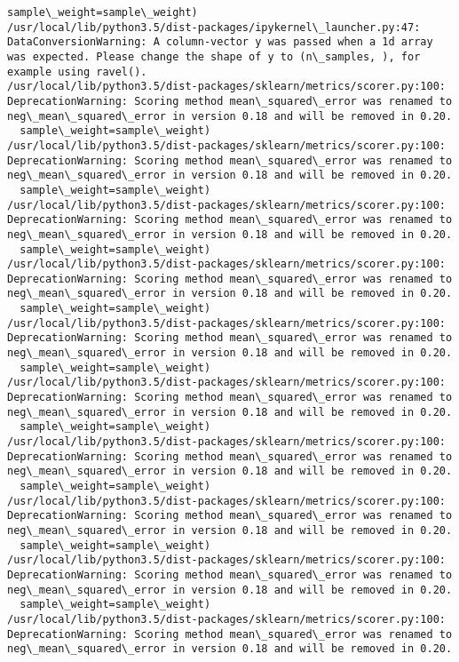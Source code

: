 \documentclass[11pt]{article}
\begin{document}
\begin{Verbatim}[commandchars=\\\{\}]
  sample\_weight=sample\_weight)
/usr/local/lib/python3.5/dist-packages/ipykernel\_launcher.py:47: DataConversionWarning: A column-vector y was passed when a 1d array was expected. Please change the shape of y to (n\_samples, ), for example using ravel().
/usr/local/lib/python3.5/dist-packages/sklearn/metrics/scorer.py:100: DeprecationWarning: Scoring method mean\_squared\_error was renamed to neg\_mean\_squared\_error in version 0.18 and will be removed in 0.20.
  sample\_weight=sample\_weight)
/usr/local/lib/python3.5/dist-packages/sklearn/metrics/scorer.py:100: DeprecationWarning: Scoring method mean\_squared\_error was renamed to neg\_mean\_squared\_error in version 0.18 and will be removed in 0.20.
  sample\_weight=sample\_weight)
/usr/local/lib/python3.5/dist-packages/sklearn/metrics/scorer.py:100: DeprecationWarning: Scoring method mean\_squared\_error was renamed to neg\_mean\_squared\_error in version 0.18 and will be removed in 0.20.
  sample\_weight=sample\_weight)
/usr/local/lib/python3.5/dist-packages/sklearn/metrics/scorer.py:100: DeprecationWarning: Scoring method mean\_squared\_error was renamed to neg\_mean\_squared\_error in version 0.18 and will be removed in 0.20.
  sample\_weight=sample\_weight)
/usr/local/lib/python3.5/dist-packages/sklearn/metrics/scorer.py:100: DeprecationWarning: Scoring method mean\_squared\_error was renamed to neg\_mean\_squared\_error in version 0.18 and will be removed in 0.20.
  sample\_weight=sample\_weight)
/usr/local/lib/python3.5/dist-packages/sklearn/metrics/scorer.py:100: DeprecationWarning: Scoring method mean\_squared\_error was renamed to neg\_mean\_squared\_error in version 0.18 and will be removed in 0.20.
  sample\_weight=sample\_weight)
/usr/local/lib/python3.5/dist-packages/sklearn/metrics/scorer.py:100: DeprecationWarning: Scoring method mean\_squared\_error was renamed to neg\_mean\_squared\_error in version 0.18 and will be removed in 0.20.
  sample\_weight=sample\_weight)
/usr/local/lib/python3.5/dist-packages/sklearn/metrics/scorer.py:100: DeprecationWarning: Scoring method mean\_squared\_error was renamed to neg\_mean\_squared\_error in version 0.18 and will be removed in 0.20.
  sample\_weight=sample\_weight)
/usr/local/lib/python3.5/dist-packages/sklearn/metrics/scorer.py:100: DeprecationWarning: Scoring method mean\_squared\_error was renamed to neg\_mean\_squared\_error in version 0.18 and will be removed in 0.20.
  sample\_weight=sample\_weight)
/usr/local/lib/python3.5/dist-packages/sklearn/metrics/scorer.py:100: DeprecationWarning: Scoring method mean\_squared\_error was renamed to neg\_mean\_squared\_error in version 0.18 and will be removed in 0.20.

\end{Verbatim}
\end{document}
